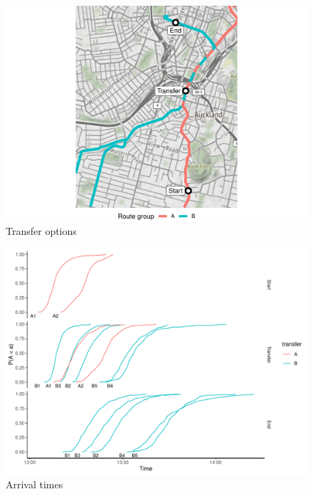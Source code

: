 \begin{knitrout}\small
{}\color{fgcolor}\begin{figure}

{\centering \includegraphics[width=\textwidth]{figure/eta_journey_transfer_prep-1} 

}

\caption[Transfer options]{Transfer options}\label{fig:eta_journey_transfer_prep}
\end{figure}


\end{knitrout}



\begin{knitrout}\small
{}\color{fgcolor}\begin{figure}

{\centering \includegraphics[width=\textwidth]{figure/eta_journey_transfer_graph-1} 

}

\caption[Arrival times]{Arrival times}\label{fig:eta_journey_transfer_graph}
\end{figure}


\end{knitrout}



